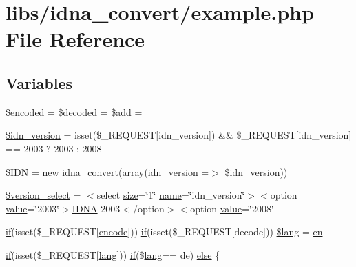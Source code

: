 \hypertarget{example_8php}{}\section{libs/idna\+\_\+convert/example.php File Reference}
\label{example_8php}
\subsection*{Variables}
\begin{DoxyCompactItemize}
\item 
\hyperlink{example_8php_af709b460501204e2ec7e34e96e7de576}{\$encoded} = \$decoded = \$\hyperlink{jquery_8js_a638fd10c6d2f5e258459b1abfa3b94ea}{add} = \textquotesingle{}\textquotesingle{}
\item 
\hyperlink{example_8php_aaa64132973e10962c52265cfbee1cb9c}{\$idn\+\_\+version} = isset(\$\+\_\+\+R\+E\+Q\+U\+E\+ST\mbox{[}\textquotesingle{}idn\+\_\+version\textquotesingle{}\mbox{]}) \&\& \$\+\_\+\+R\+E\+Q\+U\+E\+ST\mbox{[}\textquotesingle{}idn\+\_\+version\textquotesingle{}\mbox{]} == 2003 ? 2003 \+: 2008
\item 
\hyperlink{example_8php_aa45ac61e5ada434ea385befcd1aea16d}{\$\+I\+DN} = new \hyperlink{classidna__convert}{idna\+\_\+convert}(array(\textquotesingle{}idn\+\_\+version\textquotesingle{} =$>$ \$idn\+\_\+version))
\item 
\hyperlink{example_8php_a13d9753a348e3a016c3d8fb1ac173bbd}{\$version\+\_\+select} = \textquotesingle{}$<$select \hyperlink{jquery-1_8x_8js_afa6806c6ee5e63d5177f1dcc082ba6bc}{size}=\char`\"{}1\char`\"{} \hyperlink{common_8js_a22c29d2aa8ed6161ce8faa718ef76e68}{name}=\char`\"{}idn\+\_\+version\char`\"{}$>$$<$option \hyperlink{jquery_8js_abe5393d870043cf6aaa1d5ad5fce755c}{value}=\char`\"{}2003\char`\"{}$>$\hyperlink{ReadMe_8txt_a5d4f4ee07624e2d22494ccae4cc77d48}{I\+D\+NA} 2003$<$/option$>$$<$option \hyperlink{jquery_8js_abe5393d870043cf6aaa1d5ad5fce755c}{value}=\char`\"{}2008\char`\"{}\textquotesingle{}
\item 
\hyperlink{menu_2tpl_2js_2jquery_8jstree_8js_acba95bef569cfaee32c4ed0212b2bb92}{if}(isset(\$\+\_\+\+R\+E\+Q\+U\+E\+ST\mbox{[}\textquotesingle{}\hyperlink{ReadMe_8txt_a7fcb4e5f2b1b63096ccac2903dfbef97}{encode}\textquotesingle{}\mbox{]})) \hyperlink{menu_2tpl_2js_2jquery_8jstree_8js_acba95bef569cfaee32c4ed0212b2bb92}{if}(isset(\$\+\_\+\+R\+E\+Q\+U\+E\+ST\mbox{[}\textquotesingle{}decode\textquotesingle{}\mbox{]})) \hyperlink{example_8php_aef99014231eb219a8c774eb4b8463fd9}{\$lang} = \textquotesingle{}\hyperlink{jquery-1_8x_8min_8js_a5d7a777130eac935addcf4926a74b23c}{en}\textquotesingle{}
\item 
\hyperlink{menu_2tpl_2js_2jquery_8jstree_8js_acba95bef569cfaee32c4ed0212b2bb92}{if}(isset(\$\+\_\+\+R\+E\+Q\+U\+E\+ST\mbox{[}\textquotesingle{}\hyperlink{xe_8min_8js_a23a891e84296aaa19cd3c5a3fc2146ec}{lang}\textquotesingle{}\mbox{]})) \hyperlink{menu_2tpl_2js_2jquery_8jstree_8js_acba95bef569cfaee32c4ed0212b2bb92}{if}(\$\hyperlink{xe_8min_8js_a23a891e84296aaa19cd3c5a3fc2146ec}{lang}== \textquotesingle{}de\textquotesingle{}) \hyperlink{example_8php_a62bf8b36de1aa08b54e9822dc49899aa}{else} \{
\end{DoxyCompactItemize}



